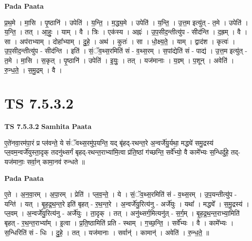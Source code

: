 \documentclass[17pt]{extarticle}
\begin{document}
\textbf{Pada Paata} \newline

प्र॒थ॒मे । मा॒सि । पृ॒ष्ठानि॑ । उपेति॑ । य॒न्ति॒ । म॒द्ध्य॒मे । उपेति॑ । य॒न्ति॒ । उ॒त्त॒म इत्यु॑त् - त॒मे । उपेति॑ । य॒न्ति॒ । तत् । आ॒हुः॒ । याम् । वै । त्रिः । एक॑स्य । अह्नः॑ । उ॒प॒सीद॒न्तीत्यु॑प - सीद॑न्ति । द॒ह्रम् । वै । सा । अप॑राभ्याम् । दोहा᳚भ्याम् । दु॒हे॒ । अथ॑ । कुतः॑ । सा । धो॒क्ष्य॒ते॒ । याम् । द्वाद॑श । कृत्वः॑ । उ॒प॒सीद॒न्तीत्यु॑प - सीद॑न्ति । इति॑ । सं॒ॅव॒थ्स॒रमिति॑ सं - व॒थ्स॒रम् । स॒पांद्येति॑ सं - पाद्य॑ । उ॒त्त॒म इत्यु॑त् - त॒मे । मा॒सि । स॒कृत् । पृ॒ष्ठानि॑ । उपेति॑ । इ॒युः॒ । तत् । यज॑मानाः । य॒ज्ञ्म् । प॒शून् । अवेति॑ । रु॒न्ध॒ते॒ । स॒मु॒द्रम् । वै ।  \newline




\section*{ TS 7.5.3.2 }

\textbf{TS 7.5.3.2 } \newline
\textbf{Samhita Paata} \newline

ए॒ते॑नवा॒रम॑पा॒रं प्र प्ल॑वन्ते॒ ये सं॑ॅवथ्स॒रमु॑प॒यन्ति॒ यद् बृ॑हद्-रथन्त॒रे अ॒न्वर्जे॑यु॒र्यथा॒ मद्ध्ये॑ समु॒द्रस्य॑ प्ल॒वम॒न्वर्जे॑युस्ता॒दृक् तदनु॑थ्सर्गं बृहद्-रथन्त॒राभ्या॑मि॒त्वा प्र॑ति॒ष्ठां ग॑च्छन्ति॒ सर्वे᳚भ्यो॒ वै कामे᳚भ्यः स॒न्धिर्दु॑हे॒ तद्-यज॑मानाः॒ सर्वा॒न् कामा॒नव॑ रुन्धते ॥ \newline

\textbf{Pada Paata} \newline

ए॒ते । अ॒न॒वा॒रम् । अ॒पा॒रम् । प्रेति॑ । प्ल॒व॒न्ते॒ । ये । सं॒ॅव॒थ्स॒रमिति॑ सं - व॒थ्स॒रम् । उ॒प॒यन्तीत्यु॑प - यन्ति॑ । यत् । बृ॒ह॒द्र॒थ॒न्त॒रे इति॑ बृहत् - र॒थ॒न्त॒रे । अ॒न्वर्जे॑यु॒रित्य॑नु - अर्जे॑युः । यथा᳚ । मद्ध्ये᳚ । स॒मु॒द्रस्य॑ । प्ल॒वम् । अ॒न्वर्जे॑यु॒रित्य॑नु - अर्जे॑युः । ता॒दृक् । तत् । अनु॑थ्सर्ग॒मित्यनु॑त् - स॒र्ग॒म् । बृ॒ह॒द्र॒थ॒न्त॒राभ्या॒मिति॑ बृहत् - र॒थ॒न्त॒राभ्या᳚म् । इ॒त्वा । प्र॒ति॒ष्ठामिति॑ प्रति -  स्थाम् । ग॒च्छ॒न्ति॒ । सर्वे᳚भ्यः । वै । कामे᳚भ्यः । स॒न्धिरिति॑ सं - धिः । दु॒हे॒ । तत् । यज॑मानाः ।  सर्वान्॑ । कामान्॑ । अवेति॑ । रु॒न्ध॒ते॒ ॥  \newline




\end{document}
